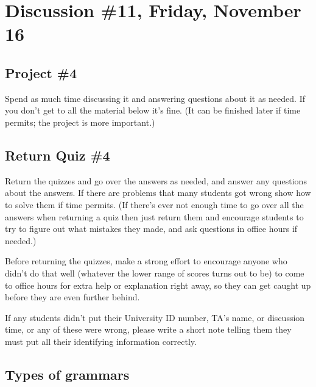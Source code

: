 \documentclass[12pt]{article}
\begin{document}

  \section{Discussion \#11, Friday, November 16}

    \subsection{Project \#4}

      Spend as much time discussing it and answering questions about it as
    needed.  If you don't get to all the material below it's fine.  (It can
    be finished later if time permits; the project is more important.)

    \subsection{Return Quiz \#4}

      Return the quizzes and go over the answers as needed, and answer any
    questions about the answers.  If there are problems that many students
    got wrong show how to solve them if time permits.  (If there's ever not
    enough time to go over all the answers when returning a quiz then just
    return them and encourage students to try to figure out what mistakes
    they made, and ask questions in office hours if needed.)


      Before returning the quizzes, make a strong effort to encourage anyone
    who didn't do that well (whatever the lower range of scores turns out to
    be) to come to office hours for extra help or explanation right away, so
    they can get caught up before they are even further behind.

      If any students didn't put their University ID number, TA's name, or
    discussion time, or any of these were wrong, please write a short note
    telling them they must put all their identifying information correctly.

    \subsection{Types of grammars}
\end{document}
